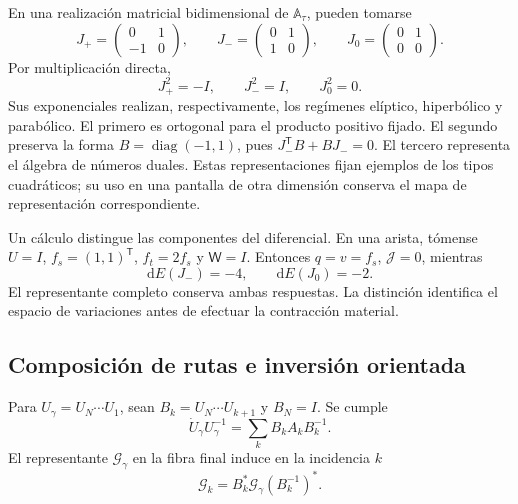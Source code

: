 En una realización matricial bidimensional de
\(\mathbb A_\tau\), pueden tomarse
\[
 J_{+}=\begin{pmatrix}0&1\\-1&0\end{pmatrix},\qquad
 J_{-}=\begin{pmatrix}0&1\\1&0\end{pmatrix},\qquad
 J_{0}=\begin{pmatrix}0&1\\0&0\end{pmatrix}.
\]
Por multiplicación directa,
\[
 J_+^2=-I,\qquad J_-^2=I,\qquad J_0^2=0.
\]
Sus exponenciales realizan, respectivamente, los regímenes elíptico,
hiperbólico y parabólico. El primero es ortogonal para el producto
positivo fijado. El segundo preserva la forma
\(B=\operatorname{diag}(-1,1)\), pues
\(J_-^{\mathsf T}B+BJ_-=0\). El tercero representa el álgebra
de números duales. Estas representaciones fijan ejemplos de los tipos
cuadráticos; su uso en una pantalla de otra dimensión conserva el mapa
de representación correspondiente.

Un cálculo distingue las componentes del diferencial. En una arista,
tómense \(U=I\), \(f_s=(1,1)^{\mathsf T}\),
\(f_t=2f_s\) y \(\mathsf W=I\). Entonces \(q=v=f_s\),
\(\mathcal J=0\), mientras
\begin{equation}
 \mathrm dE(J_-)=-4,\qquad \mathrm dE(J_0)=-2.
 \label{vii:vii:eq:control-regimenes-corriente}
\end{equation}
El representante completo conserva ambas respuestas. La distinción
identifica el espacio de variaciones antes de efectuar la contracción
material.

\subsection{Composición de rutas e inversión orientada}

\begin{proposition}
\label{vii:vii:prop:pullback-invertible}
Para \(U_\gamma=U_N\cdots U_1\), sean
\(B_k=U_N\cdots U_{k+1}\) y \(B_N=I\). Se cumple
\[
 \dot U_\gamma U_\gamma^{-1}
   =\sum_kB_kA_kB_k^{-1}.
\]
El representante \(\mathcal G_\gamma\) en la fibra final induce
en la incidencia \(k\)
\begin{equation}
 \mathcal G_k=B_k^*\mathcal G_\gamma(B_k^{-1})^*.
 \label{vii:vii:eq:transporte-contragrediente}
\end{equation}
\end{proposition}

